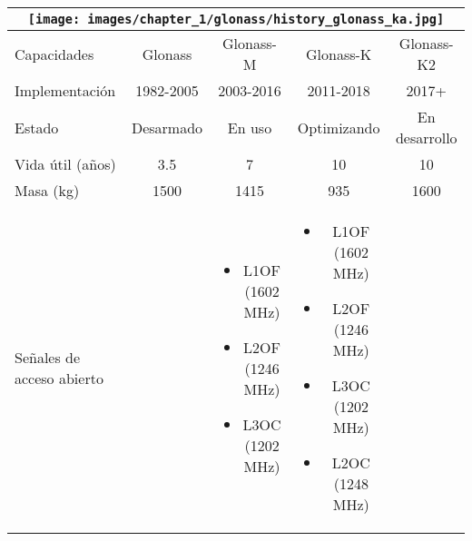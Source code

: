 \begin{justify}
    \begin{table}[H]
        \centering
        \renewcommand{\arraystretch}{1.5}
        \setlength{\tabcolsep}{5pt}
        \begin{tabular}{|p{3cm}|c|c|c|c|}
            \hline
            \multicolumn{5}{|c|}{
                \texttt{[image: images/chapter\_1/glonass/history\_glonass\_ka.jpg]}
            } \\
            \hline
            \rowcolor{lightblue}
            Capacidades & Glonass & Glonass-M & Glonass-K & Glonass-K2 \\
            \hline
            \cellcolor{lightblue}Implementación & 1982-2005 & 2003-2016 & 2011-2018 & 2017+ \\
            \hline
            \cellcolor{lightblue}Estado & Desarmado & En uso & Optimizando & En desarrollo \\
            \hline
            \cellcolor{lightblue}Vida útil (años) & 3.5 & 7 & 10 & 10 \\
            \hline
            \cellcolor{lightblue}Masa (kg) & 1500 & 1415 & 935 & 1600 \\
            \hline
            \cellcolor{lightblue}Señales de acceso abierto & \fontsize{9}{11}\selectfont{L1OF (1602 MHz)} &
            \parbox[t]{2.5cm}{
                \vspace{-7pt}
                {\fontsize{9}{11}\selectfont
                    \begin{itemize}[label={}, leftmargin=0pt, topsep=0pt, partopsep=0pt, parsep=0pt, itemsep=0pt]
                        \item L1OF (1602 MHz)
                        \item L2OF (1246 MHz)
                        \item L3OC (1202 MHz)
                    \end{itemize}
                }
            } &
            \parbox[t]{2.5cm}{
                \vspace{-7pt}
                {\fontsize{9}{11}\selectfont
                    \begin{itemize}[label={}, leftmargin=0pt, topsep=0pt, partopsep=0pt, parsep=0pt, itemsep=0pt]
                        \item L1OF (1602 MHz)
                        \item L2OF (1246 MHz)
                        \item L3OC (1202 MHz)
                        \item L2OC (1248 MHz)

\end{itemize}}}
\end{tabular}
\end{table}
\end{justify}

